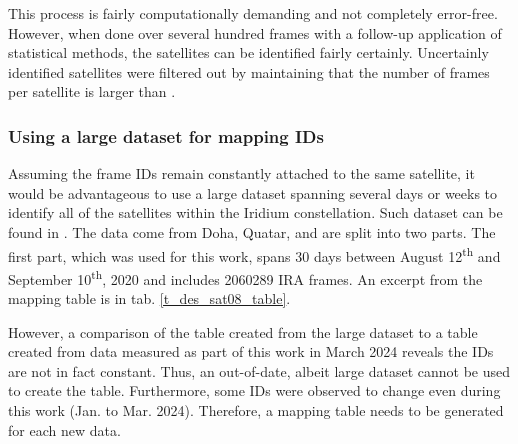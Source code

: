 This process is fairly computationally demanding and not completely error-free. However, when done over several hundred frames with a follow-up application of statistical methods, the satellites can be identified fairly certainly. Uncertainly identified satellites were filtered out by maintaining that the number of frames per satellite is larger than .

\subsubsection{Using a large dataset for mapping IDs}
\label{s_des_sat08_id}
Assuming the frame IDs remain constantly attached to the same satellite, it would be advantageous to use a large dataset spanning several days or weeks to identify all of the satellites within the Iridium constellation. Such dataset can be found in \cite{sat08}. The data come from Doha, Quatar, and are split into two parts. The first part, which was used for this work, spans 30 days between August 12\textsuperscript{th} and September 10\textsuperscript{th}, 2020 and includes \num{2060289} IRA frames. An excerpt from the mapping table is in tab. \ref{t_des_sat08_table}.

However, a comparison of the table created from the large dataset to a table created from data measured as part of this work in March 2024 reveals the IDs are not in fact constant. Thus, an out-of-date, albeit large dataset cannot be used to create the table. Furthermore, some IDs were observed to change even during this work (Jan. to Mar. 2024). Therefore, a mapping table needs to be generated for each new data.


